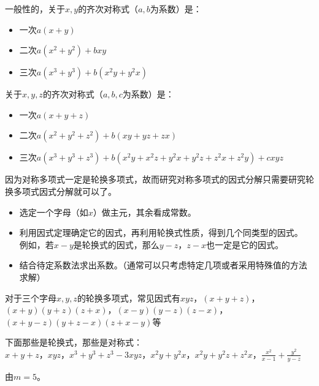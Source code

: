 \documentclass[windows,csize4]{BHCexam}
\begin{document}
\begin{groups}
    一般性的，关于$x,y$的齐次对称式（$a,b$为系数）是：
    \begin{itemize}
        \item 一次$a(x+y)$
        \item 二次$a(x^2+y^2)+bxy$
        \item 三次$a(x^3+y^3)+b(x^2y+y^2x)$
    \end{itemize}
    关于$x,y,z$的齐次对称式（$a,b,c$为系数）是：
    \begin{itemize}
        \item 一次$a(x+y+z)$
        \item 二次$a(x^2+y^2+z^2)+b(xy+yz+zx)$
        \item 三次$a(x^3+y^3+z^3)+b(x^2y+x^2z+y^2x+y^2z+z^2x+z^2y)+cxyz$
    \end{itemize}

    因为对称多项式一定是轮换多项式，故而研究对称多项式的因式分解只需要研究轮换多项式因式分解就可以了。
    \begin{itemize}
        \item 选定一个字母（如$x$）做主元，其余看成常数。
        \item 利用因式定理确定它的因式，再利用轮换式性质，得到几个同类型的因式。
        例如，若$x-y$是轮换式的因式，那么$y-z$，$z-x$也一定是它的因式。
        \item 结合待定系数法求出系数。（通常可以只考虑特定几项或者采用特殊值的方法求解）
    \end{itemize}
    对于三个字母$x,y,z$的轮换多项式，常见因式有$xyz$，$(x+y+z)$，$(x+y)(y+z)(z+x)$，$(x-y)(y-z)(z-x)$，
    $(x+y-z)(y+z-x)(z+x-y)$等


    \begin{questions}[]
        \question[5] 下面那些是轮换式，那些是对称式：\\ 
        $x+y+z$，$xyz$，$x^3+y^3+z^3-3xyz$，$x^2y+y^2x$，$x^2y+y^2z+z^2x$，$\frac{x^2}{x-1}+\frac{y^2}{y-z}$
        \begin{solution}{0.5cm}
            \methodonly 由$m=5$。
        \end{solution}
        \vspace{3.5cm}


    \end{questions}
\end{groups}



\label{lastpage}
\end{document}
